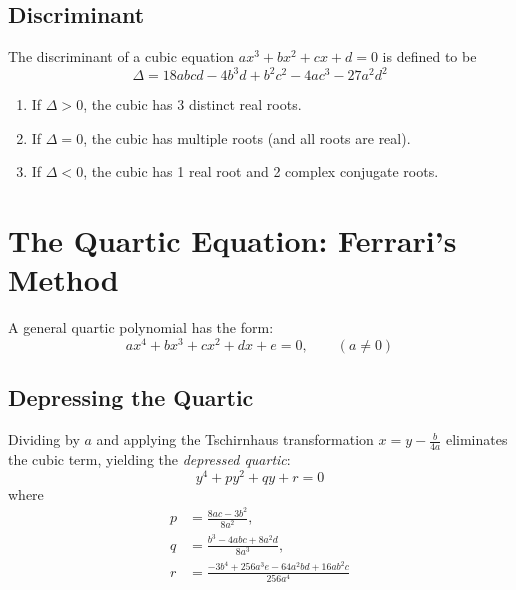 \documentclass[a4paper]{article}
\begin{document}
\subsection{Discriminant}\label{eps:subsec:discriminant2}
The discriminant of a cubic equation $a x^3 + b x^2 + c x + d = 0$ is defined to be
\begin{equation}
  \Delta = 18a b c d - 4b^{3}d + b^2 c^2 - 4ac^3 - 27a^2 d^2 \label{eps:eq:cubic-discriminant}
\end{equation}

\begin{enumerate}
  \item If $\Delta > 0$, the cubic has 3 distinct real roots.
  \item If $\Delta = 0$, the cubic has multiple roots (and all roots are real).
  \item If $\Delta < 0$, the cubic has 1 real root and 2 complex conjugate roots.
\end{enumerate}


\section{The Quartic Equation: Ferrari's Method}\label{eps:sec:quartic}

A general quartic polynomial has the form:
\begin{equation}
    a x^4 + b x^3 + c x^2 + d x + e = 0, \qquad (a \ne 0)
\end{equation}

\subsection{Depressing the Quartic}
Dividing by $a$ and applying the Tschirnhaus transformation $x = y - \frac{b}{4a}$ eliminates the cubic term, yielding the \emph{depressed quartic}:
\begin{equation}
    y^4 + p y^2 + q y + r = 0 \label{eps:eq:depressed-quartic}
\end{equation}
where
\begin{align*}
    p &= \frac{8ac - 3b^2}{8a^2}, \\
    q &= \frac{b^3 - 4abc + 8a^2d}{8a^3}, \\
    r &= \frac{-3b^4 + 256a^3e - 64a^2bd + 16ab^2c}{256a^4}
\end{align*}
\end{document}
